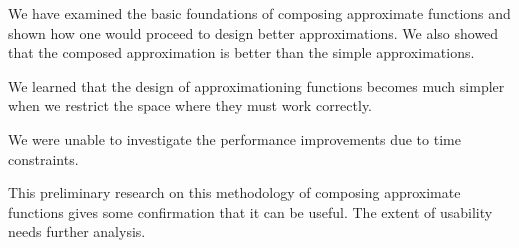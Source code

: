 \documentclass [12pt, a4]{article} %
\begin{document}
We have examined the basic foundations of composing approximate functions and shown
how one would proceed to design better approximations. We also showed that
the composed approximation is better than the simple approximations.

We learned that the design of approximationing functions becomes much simpler 
when we restrict the space where they must work correctly.

We were unable to investigate the performance improvements due to time constraints. 

This preliminary research on this methodology of composing approximate functions gives
some confirmation that it can be useful. The extent of usability needs further analysis.

\nocite{*}


\end{document}
